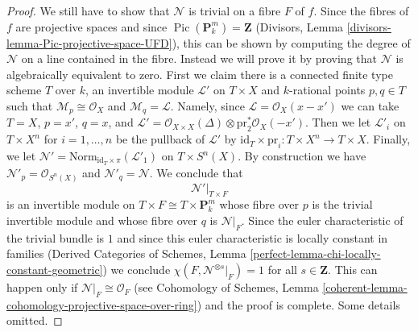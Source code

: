 \documentclass[10pt,a4paper]{amsart}
\theoremstyle{plain}
\theoremstyle{definition}
\theoremstyle{remark}
\numberwithin{equation}{subsection}
\def\Pic{\mathop{\mathrm{Pic}}\nolimits}
\begin{document}
\begin{proof}
\medskip\noindent
We still have to show that $\mathcal{N}$ is trivial on a fibre $F$
of $f$. Since the fibres of $f$ are projective spaces and since
$\Pic(\mathbf{P}^m_k) = \mathbf{Z}$
(Divisors, Lemma \ref{divisors-lemma-Pic-projective-space-UFD}),
this can be shown by computing the degree of $\mathcal{N}$
on a line contained in the fibre. Instead we will prove it by
proving that $\mathcal{N}$ is algebraically
equivalent to zero. First we claim there is a connected finite type scheme $T$
over $k$, an invertible module $\mathcal{L}'$ on $T \times X$ and
$k$-rational points $p, q \in T$ such that
$\mathcal{M}_p \cong \mathcal{O}_X$ and $\mathcal{M}_q = \mathcal{L}$.
Namely, since $\mathcal{L} = \mathcal{O}_X(x - x')$ we can take
$T = X$, $p = x'$, $q = x$, and
$\mathcal{L}' = \mathcal{O}_{X \times X}(\Delta)
\otimes \text{pr}_2^*\mathcal{O}_X(-x')$.
Then we let $\mathcal{L}'_i$ on
$T \times X^n$ for $i = 1, \ldots, n$
be the pullback of $\mathcal{L}'$ by
$\text{id}_T \times \text{pr}_i : T \times X^n \to T \times X$.
Finally, we let
$\mathcal{N}' = \text{Norm}_{\text{id}_T \times \pi}(\mathcal{L}'_1)$
on $T \times S^n(X)$.
By construction we have $\mathcal{N}'_p = \mathcal{O}_{S^n(X)}$
and $\mathcal{N}'_q = \mathcal{N}$.
We conclude that
$$
\mathcal{N}'|_{T \times F}
$$
is an invertible module on $T \times F \cong T \times \mathbf{P}^m_k$
whose fibre over $p$ is the trivial invertible module and whose fibre
over $q$ is $\mathcal{N}|_F$. Since the euler characteristic
of the trivial bundle is $1$ and since this euler characteristic
is locally constant in families (Derived Categories of Schemes,
Lemma \ref{perfect-lemma-chi-locally-constant-geometric})
we conclude $\chi(F, \mathcal{N}^{\otimes s}|_F) = 1$
for all $s \in \mathbf{Z}$. This can happen only if
$\mathcal{N}|_F \cong \mathcal{O}_F$ (see
Cohomology of Schemes, Lemma
\ref{coherent-lemma-cohomology-projective-space-over-ring})
and the proof is complete. Some details omitted.
\end{proof}



\end{document}
